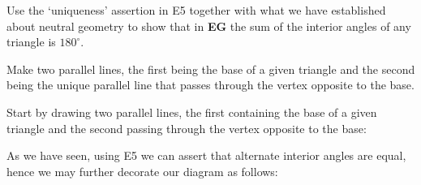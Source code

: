 \documentclass{ximera}
\begin{document}
\begin{problem}
Use the `uniqueness' assertion in E5 together with what we have
established about neutral geometry to show that in \textbf{EG} the sum
of the interior angles of any triangle is $180^\circ$.

\begin{hint}
Make two parallel lines, the first being the base of a given triangle
and the second being the unique parallel line that passes through the
vertex opposite to the base.
\end{hint}
\begin{freeResponse}
Start by drawing two parallel lines, the first containing the base of a
given triangle and the second passing through the vertex opposite to
the base:
\begin{image}
\end{image}
As we have seen, using E5 we can assert that alternate interior angles
are equal, hence we may further decorate our diagram as follows: 
\begin{image}
\end{image}
\end{freeResponse}
\end{problem}
\end{document}
